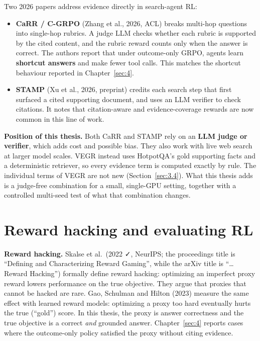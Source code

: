 Two 2026 papers address evidence directly in search-agent RL:

\begin{itemize}
\tightlist
\item
  \textbf{CaRR / C-GRPO} (Zhang et al., 2026, ACL) breaks multi-hop
  questions into single-hop rubrics. A judge LLM checks whether each
  rubric is supported by the cited content, and the rubric reward counts
  only when the answer is correct. The authors report that under
  outcome-only GRPO, agents learn \textbf{shortcut answers} and make
  fewer tool calls. This matches the shortcut behaviour reported in
  Chapter~\ref{sec:4}.
\item
  \textbf{STAMP} (Xu et al., 2026, preprint) credits each search step
  that first surfaced a cited supporting document, and uses an LLM
  verifier to check citations. It notes that citation-aware and
  evidence-coverage rewards are now common in this line of work.
\end{itemize}

\textbf{Position of this thesis.} Both CaRR and STAMP rely on an
\textbf{LLM judge or verifier}, which adds cost and possible bias. They
also work with live web search at larger model scales. VEGR instead uses
HotpotQA's gold supporting facts and a deterministic retriever, so every
evidence term is computed exactly by rule. The individual terms of VEGR
are not new (Section~\ref{sec:3.4}). What this thesis adds is a
judge-free combination for a small, single-GPU setting, together with a
controlled multi-seed test of what that combination changes.

\section{Reward hacking and evaluating RL}\label{sec:2.8}

\textbf{Reward hacking.} Skalse et al.~(2022 ✓, NeurIPS; the proceedings
title is ``Defining and Characterizing Reward Gaming'', while the arXiv
title is ``\ldots Reward Hacking'') formally define reward hacking:
optimizing an imperfect proxy reward lowers performance on the true
objective. They argue that proxies that cannot be hacked are rare. Gao,
Schulman and Hilton (2023) measure the same effect with learned reward
models: optimizing a proxy too hard eventually hurts the true (``gold'')
score. In this thesis, the proxy is answer correctness and the true
objective is a correct \emph{and} grounded answer. Chapter~\ref{sec:4}
reports cases where the outcome-only policy satisfied the proxy without
citing evidence.

